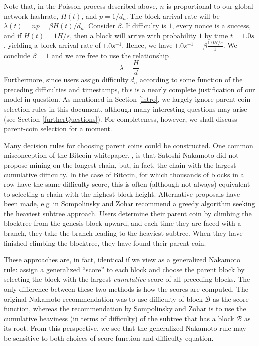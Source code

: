 \documentclass[12pt,english]{mrl}
\theoremstyle{definition}
\numberwithin{equation}{section}
\numberwithin{figure}{section}
\numberwithin{equation}{section}
\numberwithin{equation}{section}
\numberwithin{figure}{section}
\begin{document}
Note that, in the Poisson process described above, $n$ is proportional to our global network hashrate, $H(t)$, and $p=1/d_n$. The block arrival rate will be $\lambda(t) = np = \beta H(t)/d_n$. Consider $\beta$. If difficulty is $1$, every nonce is a success, and if $H(t) = 1 H/s$, then a block will arrive with probability $1$ by time $t=1.0 s$, yielding a block arrival rate of $1.0 s^{-1}$. Hence, we have $1.0 s^{-1} = \beta \frac{1.0 H/s}{1}$. We conclude $\beta = 1$ and we are free to use the relationship
\[\lambda = \frac{H}{d}\]
Furthermore, since users assign difficulty $d_n$ according to some function of the preceding difficulties and timestamps, this is a nearly complete justification of our model in question. As mentioned in Section \ref{intro}, we largely ignore parent-coin selection rules in this document, although many interesting questions may arise (see Section \ref{furtherQuestions}). For completeness, however, we shall discuss parent-coin selection for a moment. 

Many decision rules for choosing parent coins could be constructed.  One common misconception of the Bitcoin whitepaper, \cite{nakamoto2008bitcoin}, is that Satoshi Nakamoto did not propose mining on the longest chain, but, in fact, the chain with the largest cumulative difficulty. In the case of Bitcoin, for which thousands of blocks in a row have the same difficulty score, this is often (although not always) equivalent to selecting a chain with the highest block height.  Alternative proposals have been made, e.g\ in \cite{sompolinsky2013accelerating} Sompolinsky and Zohar recommend a greedy algorithm seeking the heaviest subtree approach. Users determine their parent coin by climbing the blocktree from the genesis block upward, and each time they are faced with a branch, they take the branch leading to the heaviest subtree. When they have finished climbing the blocktree, they have found their parent coin. 

These approaches are, in fact, identical if we view as a generalized Nakamoto rule: assign a generalized ``score'' to each block and choose the parent block by selecting the block with the largest \textit{cumulative} score of all preceding blocks. The only difference between these two methods is how the scores are computed. The original Nakamoto recommendation was to use difficulty of block $\mathcal{B}$ as the score function, whereas the recommendation by Sompolinsky and Zohar is to use the cumulative heaviness (in terms of difficulty) of the subtree that has a block $\mathcal{B}$ as its root.  From this perspective, we see that the generalized Nakamoto rule may be sensitive to both choices of score function and difficulty equation.
\end{document}
